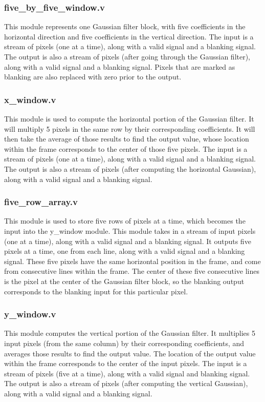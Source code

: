 \documentclass[12pt]{article}
\begin{document}
\subsubsection{five\_by\_five\_window.v}
This module represents one Gaussian filter block, with five coefficients in the 
horizontal direction and five coefficients in the vertical direction. The input 
is a stream of pixels (one at a time), along with a valid signal and a blanking 
signal. The output is also a stream of pixels (after going through the Gaussian 
filter), along with a valid signal and a blanking signal. Pixels that are 
marked as blanking are also replaced with zero prior to the output.

\subsubsection{x\_window.v}
This module is used to compute the horizontal portion of the Gaussian filter. 
It will multiply 5 pixels in the same row by their corresponding coefficients. 
It will then take the average of those results to find the output value, whose 
location within the frame corresponds to the center of those five pixels. The 
input is a stream of pixels (one at a time), along with a valid signal and a 
blanking signal. The output is also a stream of pixels (after computing the 
horizontal Gaussian), along with a valid signal and a blanking signal.

\subsubsection{five\_row\_array.v}
This module is used to store five rows of pixels at a time, which becomes the 
input into the y\_window module. This module takes in a stream of input pixels 
(one at a time), along with a valid signal and a blanking signal. It outputs 
five pixels at a time, one from each line, along with a valid signal and a 
blanking signal. These five pixels have the same horizontal position in the 
frame, and come from consecutive lines within the frame. The center of these 
five consecutive lines is the pixel at the center of the Gaussian filter block, 
so the blanking output corresponds to the blanking input for this particular 
pixel.

\subsubsection{y\_window.v}
This module computes the vertical portion of the Gaussian filter. It multiplies 
5 input pixels (from the same column) by their corresponding coefficients, and 
averages those results to find the output value. The location of the output 
value within the frame corresponds to the center of the input pixels. The input 
is a stream of pixels (five at a time), along with a valid signal and blanking 
signal. The output is also a stream of pixels (after computing the vertical 
Gaussian), along with a valid signal and a blanking signal.
\end{document}
